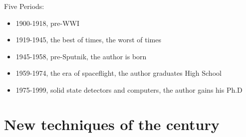 


Five Periods:
\begin{itemize}
\item 1900-1918, pre-WWI
\item 1919-1945, the best of times, the worst of times
\item 1945-1958, pre-Sputnik, the author is born
\item 1959-1974, the era of spaceflight, the author graduates High School 
\item 1975-1999, solid state detectors and computers, the author gains his Ph.D
\end{itemize}

\section{New techniques of the century}

